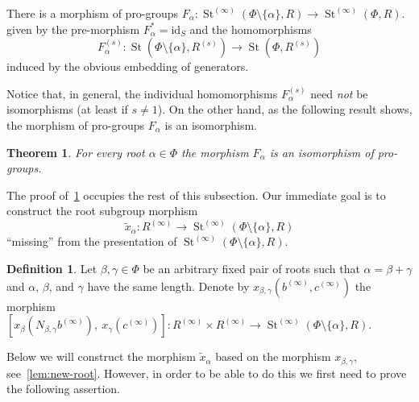 \documentclass[oneside, 11pt]{amsart}
\numberwithin{equation}{section}
\newtheorem{theorem}{Theorem}
\theoremstyle{definition}
\newtheorem{df}[lemma]{Definition} \Crefname{df}{Definition}{Definitions}
\theoremstyle{remark}
\DeclareMathOperator\St{St}
\begin{document}
There is a morphism of pro-groups
$F_\alpha \colon \St^{(\infty)}(\Phi \setminus\{\alpha\}, R) \to \St^{(\infty)}(\Phi, R).$
given by the pre-morphism $F_\alpha^{*} = \mathrm{id}_S$ and the homomorphisms \[F_\alpha^{(s)} \colon \St(\Phi \setminus\{\alpha\}, R^{(s)}) \to \St(\Phi, R^{(s)})\] induced by the obvious embedding of generators.

Notice that, in general, the individual homomorphisms $F_\alpha^{(s)}$ need {\it not} be isomorphisms (at least if $s \neq 1$). On the other hand, as the following result shows, the morphism of pro-groups $F_\alpha$ is an isomorphism. 
\begin{theorem}\label{SingleRootElimination} For every root \(\alpha \in \Phi\) the morphism $F_\alpha$ is an isomorphism of pro-groups. \end{theorem}
The proof of~\cref{SingleRootElimination} occupies the rest of this subsection.
Our immediate goal is to construct the root subgroup morphism
\[\widetilde x_{ \alpha} \colon R^{(\infty)} \to \St^{(\infty)}(\Phi \setminus \{ \alpha\}, R) \] ``missing'' from the presentation of $\St^{(\infty)}(\Phi\setminus\{\alpha\}, R)$. %

\begin{df} \label{def:xbg}
Let $\beta, \gamma \in \Phi$ be an arbitrary fixed pair of roots such that $\alpha = \beta+\gamma$ and $\alpha$, $\beta$, and $\gamma$ have the same length. 
Denote by $x_{\beta,\gamma}(b^{(\infty)}, c^{(\infty)})$ the morphism
 $[x_\beta(N_{\beta,\gamma}b^{(\infty)}),\ x_\gamma(c^{(\infty)})]\colon R^{(\infty)} \times R^{(\infty)} \to \St^{(\infty)}(\Phi \setminus\{\alpha\}, R).$
\end{df}
Below we will construct the morphism $\widetilde x_\alpha$ based on the morphism $x_{\beta,\gamma}$, see~\cref{lem:new-root}. However, in order to be able to do this we first need to prove the following assertion.
\end{document}
